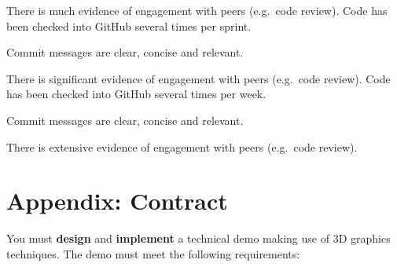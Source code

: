 \documentclass{../../fal_assignment}
\begin{document}
\begin{markingrubric}
            \par There is much evidence of engagement with peers (e.g.\ code review).
        \grade Code has been checked into GitHub several times per sprint.
            \par Commit messages are clear, concise and relevant.
            \par There is significant evidence of engagement with peers (e.g.\ code review).
        \grade Code has been checked into GitHub several times per week.
            \par Commit messages are clear, concise and relevant.
            \par There is extensive evidence of engagement with peers (e.g.\ code review).
\end{markingrubric}

\section*{Appendix: Contract}

You must \textbf{design} and \textbf{implement} a technical demo making use of 3D graphics techniques.
The demo must meet the following requirements:
\end{document}
